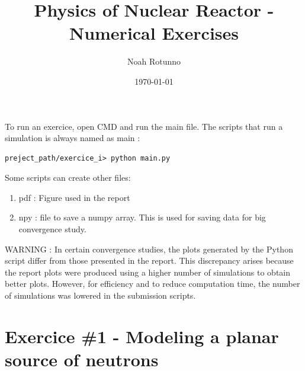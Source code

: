 \documentclass[11pt,a4paper]{article}
\begin{document}
\title{Physics of Nuclear Reactor - Numerical Exercises}
\author{Noah Rotunno\\  %
}
\date{\today}
\maketitle


\newpage

To run an exercice, open CMD and run the main file. The scripts that run a simulation is always named as main : \\
\begin{lstlisting}
preject_path/exercice_i> python main.py
\end{lstlisting}

Some scripts can create other files:
\begin{enumerate}
	\item pdf : Figure used in the report
	\item npy : file to save a numpy array. This is used for saving data for big convergence study.
\end{enumerate}

WARNING : In certain convergence studies, the plots generated by the Python script differ from those presented in the report. This discrepancy arises because the report plots were produced using a higher number of simulations to obtain better plots. However, for efficiency and to reduce computation time, the number of simulations was lowered in the submission scripts.

\section{Exercice \#1 - Modeling a planar source of neutrons}
\end{document}
